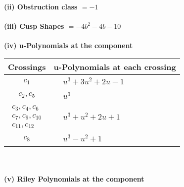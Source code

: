 \documentclass[1p]{elsarticle_modified}
\theoremstyle{definition}
\begin{document}
\flushleft \textbf{(ii) Obstruction class $= -1$}\\~\\
\flushleft \textbf{(iii) Cusp Shapes $= -4 b^2-4 b-10$}\\~\\
\newpage\renewcommand{\arraystretch}{1}
\flushleft \textbf{(iv) u-Polynomials at the component}\newline \\
\begin{tabular}{m{50pt}|m{274pt}}
Crossings & \hspace{64pt}u-Polynomials at each crossing \\
\hline $$\begin{aligned}c_{1}\end{aligned}$$&$\begin{aligned}
&u^3+3 u^2+2 u-1
\end{aligned}$\\
\hline $$\begin{aligned}c_{2},c_{5}\end{aligned}$$&$\begin{aligned}
&u^3
\end{aligned}$\\
\hline $$\begin{aligned}c_{3},c_{4},c_{6}\\c_{7},c_{9},c_{10}\\c_{11},c_{12}\end{aligned}$$&$\begin{aligned}
&u^3+u^2+2 u+1
\end{aligned}$\\
\hline $$\begin{aligned}c_{8}\end{aligned}$$&$\begin{aligned}
&u^3- u^2+1
\end{aligned}$\\
\hline
\end{tabular}\\~\\
\newpage\renewcommand{\arraystretch}{1}
\flushleft \textbf{(v) Riley Polynomials at the component}\newline \\
\end{document}
